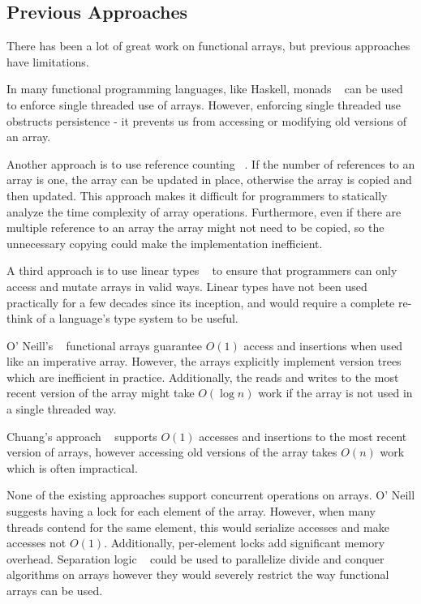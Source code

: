 \documentclass[preprint]{sigplanconf}
\begin{document}
\subsection{Previous Approaches}

There has been a lot of great work on functional arrays, but previous approaches have limitations. 

In many functional programming languages, like Haskell, monads ~\cite{wadler-monads} can be used to enforce single threaded use of arrays. However, enforcing single threaded use obstructs persistence - it prevents us from accessing or modifying old versions of an array.

Another approach is to use reference counting ~\cite{hudak}. If the number of references to an array is one, the array can be updated in place, otherwise the array is copied and then updated. This approach makes it difficult for programmers to statically analyze the time complexity of array operations. Furthermore, even if there are multiple reference to an array the array might not need to be copied, so the unnecessary copying could make the implementation inefficient. 

A third approach is to use linear types ~\cite{wadler-lintypes} to ensure that programmers can only access and mutate arrays in valid ways. Linear types have not been used practically for a few decades since its inception, and would require a complete re-think of a language's type system to be useful.

O' Neill's ~\cite{oneill} functional arrays guarantee $O(1)$ access and insertions when used like an imperative array. However, the arrays explicitly implement version trees which are inefficient in practice. Additionally, the reads and writes to the most recent version of the array might take $O(\log{n})$ work if the array is not used in a single threaded way.

Chuang's approach ~\cite{chuang} supports $O(1)$ accesses and insertions to the most recent version of arrays, however accessing old versions of the array takes $O(n)$ work which is often impractical.

None of the existing approaches support concurrent operations on arrays. O' Neill suggests having a lock for each element of the array. However, when many threads contend for the same element, this would serialize accesses and make accesses not $O(1)$. Additionally, per-element locks add significant memory overhead. Separation logic ~\cite{reynolds} could be used to parallelize divide and conquer algorithms on arrays however they would severely restrict the way functional arrays can be used.
\end{document}
